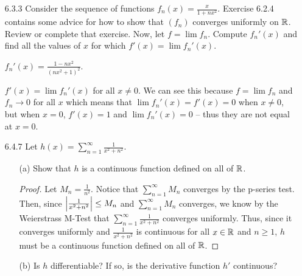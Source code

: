 \documentclass[12pt,letterpaper]{article}
\begin{document}
\begin{itemize}[leftmargin=!,labelindent=5pt]
\begin{itemize}
\begin{proof}
                        Since $\abs{f_n}\leq M$ and $\abs{g_n} \leq M$ for all $n \in \bbN$, this simplifies to $M\frac{\epsilon}{2M} + M\frac{\epsilon}{2M} = \epsilon$.
                        So, $\abs{f_n(x)g_n(x) - f_m(x)g_m(x)} < \epsilon$ for all $m,n \geq N$ and $x\in A$ as desired which means $(f_n g_n)$ converges uniformly.
                    \end{proof}
            \end{itemize}
        \item [6.3.3] Consider the sequence of functions $f_n(x) = \frac{x}{1+nx^2}$. Exercise 6.2.4 contains some advice for how to show that $(f_n)$ converges uniformly on $\mathbb{R}$. Review or complete that exercise. Now, let $f = \lim f_n$. Compute $f_n'(x)$ and find all the values of $x$ for which $f'(x) = \lim f_n'(x)$.
            
            $f_n'(x) = \frac{1-nx^2}{(nx^2 + 1)^2}$.

            $f'(x) = \lim f_n'(x)$ for all $x \neq 0$.
            We can see this because $f = \lim f_n$ and $f_n \to 0$ for all $x$ which means that $\lim f_n'(x) = f'(x) = 0$ when $x \neq 0$, but when $x = 0$, $f'(x) = 1$ and $\lim f_n'(x) = 0$ -- thus they are not equal at $x=0$.
        \item [6.4.7] Let $h(x) = \sum_{n=1}^\infty \frac{1}{x^2 + n^2}$.
            \begin{itemize}
                \item [(a)] Show that $h$ is a continuous function defined on all of $\mathbb{R}$.
                    \begin{proof}
                        Let $M_n = \frac{1}{n^2}$.
                        Notice that $\sum_{n=1}^\infty M_n$ converges by the p-series test.
                        Then, since $\abs{\frac{1}{x^2 + n^2}} \leq M_n$ and $\sum_{n=1}^\infty M_n$ converges, we know by the Weierstrass M-Test that $\sum_{n=1}^\infty \frac{1}{x^2 + n^2}$ converges uniformly.
                        Thus, since it converges uniformly and $\frac{1}{x^2 + n^2}$ is continuous for all $x \in \mathbb{R}$ and $n \geq 1$, $h$ must be a continuous function defined on all of $\mathbb{R}$.
                    \end{proof}
                \item [(b)] Is $h$ differentiable? If so, is the derivative function $h'$ continuous?
                

\end{itemize}
\end{itemize}
\end{document}

